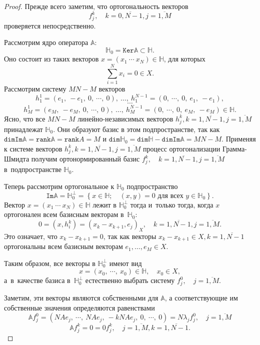  \begin{proof}
     Прежде всего заметим, что ортогональность векторов
     \[ f_j^k, \quad k=\overline{0,N-1}, j=\overline{1,M} \]
     проверяется непосредственно.

     Рассмотрим ядро оператора \( \mathbb{A} \):
     \[ \mathbb{H}_0 = \mathtt{Ker}\mathbb{A} \subset \mathbb{H}. \]
     Оно состоит из таких векторов \( x = (x_1 ~\cdots~ x_N) \in \mathbb{H} \),
     для которых \[ \sum_{i=1}^N x_i = 0 \in X. \]
     Рассмотрим систему \( MN - M \) векторов
     \[ h_1^1 = ( e_1, ~ -e_1, ~ 0, ~\cdots, ~ 0), ~ \ldots, ~ h_1^{N-1} = (0, ~\cdots,~ 0, ~ e_1, ~ -e_1), \]
     \[ \cdots \]
     \[ h_M^1 = ( e_M, ~ -e_M, ~ 0, ~\cdots, ~ 0), ~ \ldots, ~ h_M^{N-1} = (0, ~\cdots,~ 0, ~ e_M, ~ -e_M) \in \mathbb{H}. \]
     Ясно, что все \( MN - M \) линейно-независимых векторов
     \( h_j^k, k=\overline{1,N-1},j=\overline{1,M} \)
     принадлежат \( \mathbb{H}_0 \).
     Они образуют базис в этом подпространстве, так как
     \( \mathtt{dim}\mathtt{Im}\mathbb{A} = \mathtt{rank}\mathbb{A} = \mathtt{rank}A = M \)
     и \( \mathtt{dim}\mathbb{H}_0 = \mathtt{dim}\mathbb{H} - \mathtt{dim}\mathtt{Im}\mathbb{A} = MN - M \).
     Применяя к системе векторов \( h_j^k, k=\overline{1,N-1},j=\overline{1,M} \) процесс ортогонализации Грамма-Шмидта
     получим ортонормированный базис \( f_j^k, \quad k=\overline{1,N-1},j=\overline{1,M} \) в~подпространстве \( \mathbb{H}_0 \).

     Теперь рассмотрим ортогональное к \( \mathbb{H}_0 \) подпространство
     \[ \mathtt{Im}\mathbb{A} = \mathbb{H}_0^\perp = \left\{ x\in\mathbb{H};\quad (x,y)=0 \text{ для всех } y\in\mathbb{H}_0 \right\}. \]
     Вектор \( x=(x_1 ~\cdots~ x_N)\in\mathbb{H} \) лежит в \( \mathbb{H}_0^\perp \)
     тогда и~только тогда, когда
     \( x \) ортогонален всем базисным векторам в~\( \mathbb{H}_0 \):
     \[ 0 = (x,h_i^k) = (x_k - x_{k+1}, e_j)_X, \quad k=\overline{1,N-1}, j=\overline{1,M}. \]
     Это означает, что \( x_k - x_{k+1} = 0 \), так как векторы \( x_k - x_{k+1} \in X, k=\overline{1,N-1} \)
     ортогональны всем базисным векторам \( e_1, \ldots, e_M \in X \).

     Таким образом, все векторы в \( \mathbb{H}_0^\perp \) имеют вид
     \[ x = (x_0, ~\cdots, ~ x_0)\in\mathbb{H}, \quad x_0\in X, \]
     а~в~качестве базиса в~\( \mathbb{H}_0^\perp \) естественно выбрать
     систему \( f_j^0, \quad j=\overline{1,M} \).

     Заметим, эти векторы являются собственными для \( \mathbb{A} \),
     а соответствующие им собственные значения определяются равенствами
     \[ \mathbb{A} f_j^0 = ( N A e_j, ~ \cdots, ~ NA e_j, ~ -kNAe_j, ~ 0, ~ \cdots, ~ 0 ) = N\lambda_j f_j^0, \quad j=\overline{1,M} \]
     \[ \mathbb{A} f_j^k = 0 = 0 f_j^k, \quad j=\overline{1,M}, k=\overline{1,N-1}. \]


\end{proof}
